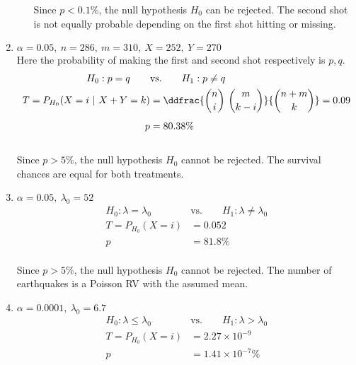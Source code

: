 \begin{enumerate}
\begin{enumerate}
		Since $ p < 0.1\% $, the null hypothesis $ H_0 $ can be rejected. The second shot is not equally probable depending on the first shot hitting or missing.\\	
	
	\end{enumerate}
	
	\item $\alpha = 0.05,\ n = 286,\ m = 310,\ X = 252,\ Y = 270$\\
	Here the probability of making the first and second shot respectively is $ p, q $.\\
	\begin{align}
		H_0 : p = q \qquad &\text{vs.} \qquad H_1 : p  \neq q \nonumber \\
		T = P_{H_0}(X = i\ |\ X+Y = k) &= \ddfrac{\binom{n}{i}\ \binom{m}{k-i}}{\binom{n+m}{k}} = 0.09 \nonumber \\[1ex]
		p &= 80.38\%
	\end{align}\\
	
	Since $ p > 5\% $, the null hypothesis $ H_0 $ cannot be rejected. The survival chances are equal for both treatments.\\
	
	\item $\alpha = 0.05,\ \lambda_0 = 52$\\
	\begin{align}
		H_0 : \lambda = \lambda_0 \qquad &\text{vs.} \qquad H_1 : \lambda \neq \lambda_0 \nonumber \\
		T = P_{H_0}(X = i) &= 0.052 \nonumber \\[1ex]
		p &= 81.8\%
	\end{align}\\
	
	Since $ p > 5\% $, the null hypothesis $ H_0 $ cannot be rejected. The number of earthquakes is a Poisson RV with the assumed mean.\\
	
	\item $\alpha = 0.0001,\ \lambda_0 = 6.7$\\
	\begin{align}
		H_0 : \lambda \leq \lambda_0 \qquad &\text{vs.} \qquad H_1 : \lambda > \lambda_0 \nonumber \\
		T = P_{H_0}(X = i) &= 2.27 \times 10^{-9} \nonumber \\[1ex]
		p &= 1.41 \times 10^{-7}\%
	\end{align}\\
	

\end{enumerate}
